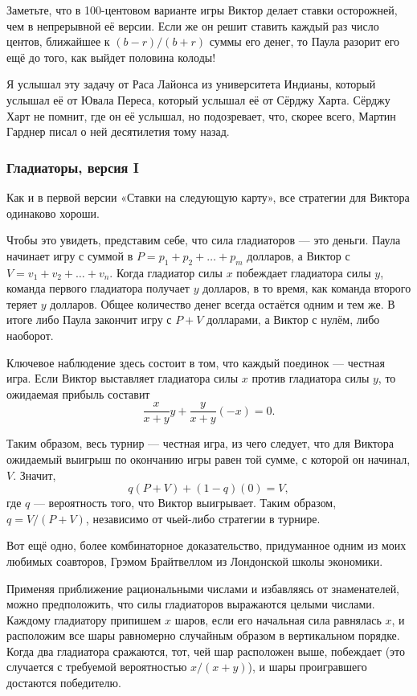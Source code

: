 Заметьте, что в 100-центовом варианте игры Виктор делает ставки осторожней, чем в непрерывной её версии.
Если же он решит ставить каждый раз число центов, ближайшее к $(b - r)/(b + r)$ суммы его денег, то Паула разорит его ещё до того, как выйдет половина колоды!

\medskip

Я услышал эту задачу от Раса Лайонса из университета Индианы, %
который услышал её от Ювала Переса, %
который услышал её от Сёрджу Харта. %
Сёрджу Харт не помнит, где он её услышал, но подозревает, что, скорее всего, Мартин Гарднер писал о ней десятилетия тому назад.

\subsubsection*{Гладиаторы, версия I}%

Как и в первой версии «Ставки на следующую карту», все стратегии для Виктора одинаково хороши.

Чтобы это увидеть, представим себе, что сила гладиаторов --- это деньги.
Паула начинает игру с суммой в $P = p_1 + p_2 + \dots + p_m$ долларов, 
а Виктор с $V = v_1 + v_2 + \dots + v_n$.
Когда гладиатор силы $x$ побеждает гладиатора силы $y$, команда первого гладиатора получает $y$ долларов, в то время, как команда второго теряет $y$ долларов.
Общее количество денег всегда остаётся одним и тем же.
В итоге либо Паула закончит игру с $P+V$ долларами, а Виктор с нулём, либо наоборот.

Ключевое наблюдение здесь состоит в том, что каждый поединок --- честная игра.
Если Виктор выставляет гладиатора силы $x$ против гладиатора силы $y$, то ожидаемая прибыль составит 
\[\frac{x}{x+y}y + \frac{y}{x+y}(-x) =0.\]

Таким образом, весь турнир --- честная игра, из чего следует, что для Виктора ожидаемый выигрыш по окончанию игры равен той сумме, с которой он начинал, $V$.
Значит,
\[q(P + V) + (1-q)(0) = V,\]
где $q$ --- вероятность того, что Виктор выигрывает.
Таким образом, $q = V/(P+V)$,
независимо от чьей-либо стратегии в турнире.
\heart

Вот ещё одно, более комбинаторное доказательство, придуманное одним из моих любимых соавторов, Грэмом Брайтвеллом из Лондонской школы экономики. %

Применяя приближение рациональными числами и избавляясь от знаменателей, можно предположить, что силы гладиаторов выражаются целыми числами.
Каждому гладиатору припишем $x$ шаров, если его начальная сила равнялась $x$, и расположим все шары равномерно случайным образом в вертикальном порядке.
Когда два гладиатора сражаются, тот, чей шар расположен выше, побеждает (это случается с требуемой вероятностью $x/(x+y)$), и шары проигравшего достаются победителю.

